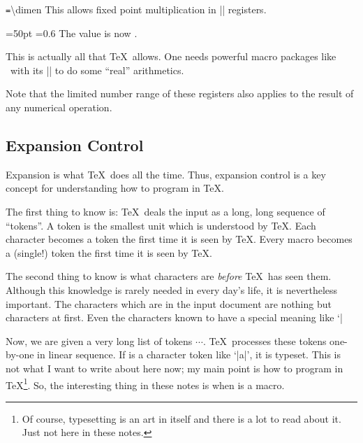 \documentclass[a4paper]{ltxdoc}
\begin{document}
\begin{command}{\dimen{}\texttt{=}\textbackslash dimen}
	This allows fixed point multiplication in |\dimen| registers.
\begin{codeexample}[]
=50pt
=0.6
The value is now \the{}.
\end{codeexample}
\end{command}

This is actually all that \TeX\ allows. One needs powerful macro packages like \PGF\ with its |\pgfmathparse| to do some ``real'' arithmetics.

Note that the limited number range of these registers also applies to the result of any numerical operation.


\subsection{Expansion Control}
\label{sec:expansion:control}
Expansion is what \TeX\ does all the time. Thus, expansion control is a key concept for understanding how to program in \TeX.

The first thing to know is: \TeX\ deals the input as a long, long sequence of ``tokens''. A token is the smallest unit which is understood by \TeX. Each character becomes a token the first time it is seen by \TeX. Every macro becomes a (single!) token the first time it is seen by \TeX.

The second thing to know is what characters are \emph{before} \TeX\ has seen them. Although this knowledge is rarely needed in every day's life, it is nevertheless important. The characters which are in the input document are nothing but characters at first. Even the characters known to have a special meaning like `|%

Now, we are given a very long list of tokens $\cdots$. \TeX\ processes these tokens one-by-one in linear sequence. If  is a character token like `|a|', it is typeset. This is not what I want to write about here now; my main point is how to program in \TeX\footnote{Of course, typesetting is an art in itself and there is a lot to read about it. Just not here in these notes.}. So, the interesting thing in these notes is when  is a macro.
\end{document}
